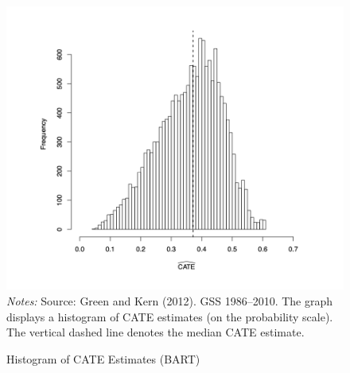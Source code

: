 \documentclass[12pt]{article}
\begin{document}
\begin{figure}[!ht]
\renewcommand{\thefigure}{A2}
\caption{Histogram of CATE Estimates (BART)}
	\centering
   	 	\includegraphics[width = 0.6\linewidth]{Graphs/A_GK_catefreq.png} \\ 
\footnotesize
\emph{Notes:} Source: Green and Kern (2012). GSS 1986–2010. The graph displays a histogram of CATE estimates (on the probability scale). The vertical dashed line denotes the median CATE estimate.
\end{figure} 
\end{document}
